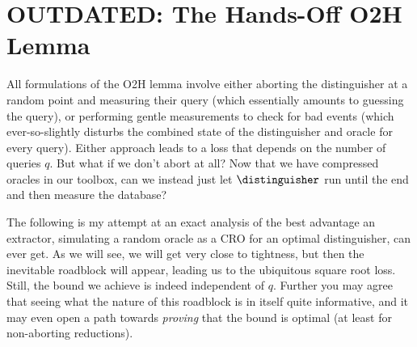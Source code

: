 \section{OUTDATED: The Hands-Off O2H Lemma}
  All formulations of the O2H lemma involve either aborting the distinguisher at a
    random point and measuring their query (which essentially amounts to
    guessing the query), or performing gentle measurements to check for bad
    events (which ever-so-slightly disturbs the combined state of the distinguisher and
    oracle for every query). Either approach leads to a loss that
    depends on the number of queries $q$.
    But what if we don't abort at all? Now that we have compressed oracles in
    our toolbox, can we instead just let $\distinguisher$ run until the
    end and then measure the database?
  
  The following is my attempt at an exact analysis of the best advantage
    an extractor, simulating a random oracle as a CRO for an optimal
    distinguisher, can ever get. As we will see, we will get very
    close to tightness, but then the inevitable
    roadblock will appear, leading us to the ubiquitous square root loss. 
    Still, the bound we achieve is indeed independent of $q$.
    Further you may agree that seeing what the nature of this roadblock is in
    itself quite informative,
    and it may even open a path towards \emph{proving} that the bound is optimal
    (at least for non-aborting reductions).



